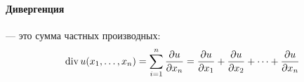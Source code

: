 \paragraph{Дивергенция}%
--- это сумма частных производных:
$$
	\operatorname{div} u(x_1, \dots, x_n) =
	\sum_{i=1}^n \frac{\partial u}{\partial x_n} =
	\frac{\partial u}{\partial x_1} + \frac{\partial u}{\partial x_2} +
	\dots + \frac{\partial u}{\partial x_n}
$$
